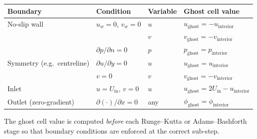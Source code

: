 \begin{center}
\begin{tabular}{llll}
\toprule
Boundary & Condition & Variable & Ghost cell value \\
\midrule
No-slip wall  & $u_w=0$, $v_w=0$  & $u$  & $u_\text{ghost} = -u_\text{interior}$ \\
              &                   & $v$  & $v_\text{ghost} = -v_\text{interior}$ \\
              & $\partial p/\partial n=0$ & $p$ & $p_\text{ghost} = p_\text{interior}$ \\
\midrule
Symmetry (e.g.\ centreline) & $\partial u/\partial y=0$ & $u$ & $u_\text{ghost} = u_\text{interior}$ \\
                             & $v=0$ & $v$ & $v_\text{ghost} = -v_\text{interior}$ \\
\midrule
Inlet & $u=U_\text{in}$, $v=0$ & $u$ & $u_\text{ghost} = 2U_\text{in}-u_\text{interior}$ \\
\midrule
Outlet (zero-gradient) & $\partial(\cdot)/\partial x=0$ & any & $\phi_\text{ghost}=\phi_\text{interior}$ \\
\bottomrule
\end{tabular}
\end{center}

The ghost cell value is computed \emph{before} each Runge--Kutta or Adams--Bashforth stage so that boundary conditions are enforced at the correct sub-step.

